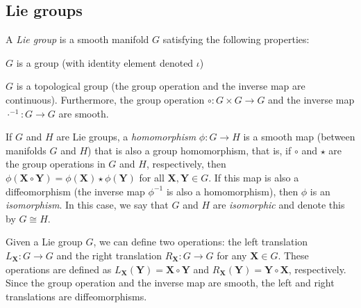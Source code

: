 \subsection{Lie groups}
\begin{definition}
    A \emph{Lie group} is a smooth manifold $G$ satisfying the following properties:
    \begin{property}
        \item $G$ is a group (with identity element denoted $\iota$)
        \item $G$ is a topological group (the group operation and the inverse map are continuous). Furthermore, the group operation $\circ: G\times G\to G$ and the inverse map $\cdot^{-1}: G\to G$ are smooth.
    \end{property}
\end{definition}
\begin{definition}
    If $G$ and $H$ are Lie groups, a \emph{homomorphism} $\phi: G\to H$ is a smooth map (between manifolds $G$ and $H$) that is also a group homomorphism, that is, if $\circ$ and $\star$ are the group operations in $G$ and $H$, respectively, then $\phi(\mathbf{X}\circ\mathbf{Y}) = \phi(\mathbf{X})\star\phi(\mathbf{Y})$ for all $\mathbf{X},\mathbf{Y}\in G$. If this map is also a diffeomorphism (the inverse map $\phi^{-1}$ is also a homomorphism), then $\phi$ is an \emph{isomorphism}. In this case, we say that $G$ and $H$ are \emph{isomorphic} and denote this by $G\cong H$.
\end{definition}

Given a Lie group $G$, we can define two operations: the left translation $L_{\mathbf{X}}: G\to G$ and the right translation $R_{\mathbf{X}}: G\to G$ for any $\mathbf{X}\in G$. These operations are defined as $L_{\mathbf{X}}(\mathbf{Y}) = \mathbf{X}\circ\mathbf{Y}$ and $R_{\mathbf{X}}(\mathbf{Y}) = \mathbf{Y}\circ\mathbf{X}$, respectively. Since the group operation and the inverse map are smooth, the left and right translations are diffeomorphisms.

